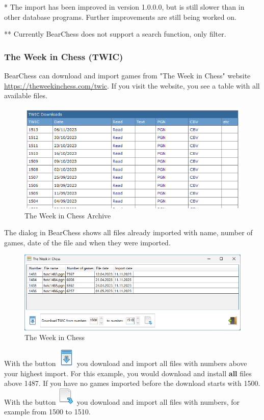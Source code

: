 \documentclass[11pt,a4paper]{article}
\begin{document}
{\color{red}*} The import has been improved in version 1.0.0.0, but is still slower than in other database programs. Further improvements are still being worked on.

{\color{red}**} Currently BearChess does not support a search function, only filter.

\subsubsection{The Week in Chess (TWIC)} \label{twic}
BearChess can download and import games from "The Week in Chess" website \url{https://theweekinchess.com/twic}. If you visit the website, you see a table with all available files.

\begin{figure}[H]
	\centering
	\includegraphics[scale=0.6]{twic2.png}
	\caption{The Week in Chess Archive}
	\label{fig:TWIC2}
\end{figure}


The dialog in BearChess shows all files already imported with name, number of games, date of the file and when they were imported.\\
\begin{figure}[H]
	\centering
	\includegraphics[scale=0.6]{twic1.png}
	\caption{The Week in Chess}
	\label{fig:TWIC1}
\end{figure}

With the button \includegraphics[scale=0.5]{download.png} you download and import all files with numbers above your highest import. For this example, you would download and install \textbf{all} files above 1487. If you have no games imported before the download starts with 1500.\\
With the button \includegraphics[scale=0.5]{mark_to_download.png} you download and import all files with numbers, for example from 1500 to 1510.\\
\end{document}
